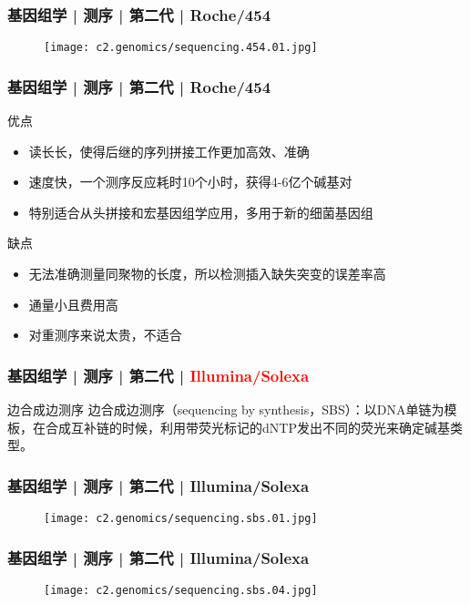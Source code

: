 \begin{frame}
  \frametitle{基因组学 | 测序 | 第二代 | Roche/454}
  \begin{figure}
    \centering
    \texttt{[image: c2.genomics/sequencing.454.01.jpg]}
  \end{figure}
\end{frame}

\begin{frame}
  \frametitle{基因组学 | 测序 | 第二代 | Roche/454}
  \begin{block}{优点}
    \begin{itemize}
      \item 读长长，使得后继的序列拼接工作更加高效、准确
      \item 速度快，一个测序反应耗时10个小时，获得4-6亿个碱基对
      \item 特别适合从头拼接和宏基因组学应用，多用于新的细菌基因组
    \end{itemize}
  \end{block}
  \pause
  \begin{block}{缺点}
    \begin{itemize}
      \item 无法准确测量同聚物的长度，所以检测插入缺失突变的误差率高
      \item 通量小且费用高
      \item 对重测序来说太贵，不适合
    \end{itemize}
  \end{block}
\end{frame}

\begin{frame}
  \frametitle{基因组学 | 测序 | 第二代 | \textcolor{red}{Illumina/Solexa}}
  \begin{block}{边合成边测序}
边合成边测序（sequencing by synthesis，SBS）：以DNA单链为模板，在合成互补链的时候，利用带荧光标记的dNTP发出不同的荧光来确定碱基类型。
  \end{block}
\end{frame}

\begin{frame}
  \frametitle{基因组学 | 测序 | 第二代 | Illumina/Solexa}
  \begin{figure}
    \centering
    \texttt{[image: c2.genomics/sequencing.sbs.01.jpg]}
  \end{figure}
\end{frame}

\begin{frame}
  \frametitle{基因组学 | 测序 | 第二代 | Illumina/Solexa}
  \begin{figure}
    \centering
    \texttt{[image: c2.genomics/sequencing.sbs.04.jpg]}
  \end{figure}
\end{frame}

